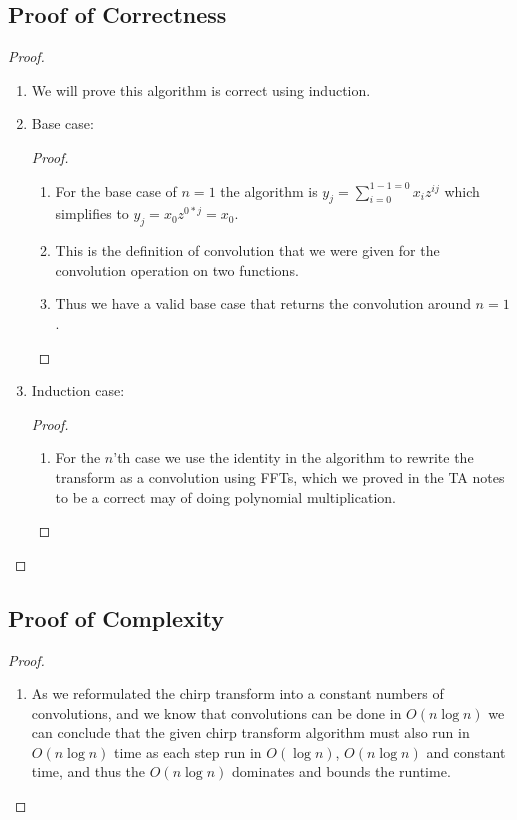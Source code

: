 \documentclass{article}
\begin{document}
\subsection{Proof of Correctness}
\begin{proof}
      \begin{enumerate}
            \item We will prove this algorithm is correct using induction.
            \item Base case:
                  \begin{proof}
                        \begin{enumerate}
                              \item For the base case of \(n=1\) the algorithm is \(y_j =
                                    \sum_{i=0}^{1-1 =0} x_i z^{ij}\) which simplifies to \(y_j = x_0
                                    z^{0*j} = x_0\).
                              \item This is the definition of convolution that we were
                                    given for the convolution operation on two functions.
                              \item Thus we have a valid base case that returns the convolution
                                    around \(n=1\).
                        \end{enumerate}
                  \end{proof}
            \item Induction case:
                  \begin{proof}
                        \begin{enumerate}
                              \item For the \(n\)'th case we use the identity in the algorithm to
                                    rewrite the transform as a convolution using FFTs, which we proved in the TA
                                    notes to be a correct may of doing polynomial multiplication.
                        \end{enumerate}
                  \end{proof}
      \end{enumerate}
\end{proof}

\subsection{Proof of Complexity}
\begin{proof}
      \begin{enumerate}
            \item As we reformulated the chirp transform into a constant numbers of
                  convolutions, and we know that convolutions can be done in \(O(n \log n)\)
                  we can conclude that the given chirp transform algorithm must also run in
                  \(O(n \log n)\) time as each step run in \(O(\log n)\), \(O(n \log n)\) and
                  constant time, and thus the \(O(n \log n)\) dominates and bounds the runtime.
      \end{enumerate}
\end{proof}
\end{document}
